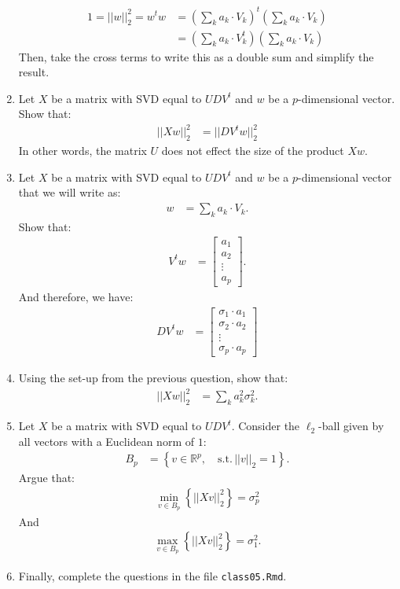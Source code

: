 \documentclass[12pt,hidelinks]{article}
\numberwithin{equation}{section}
\begin{document}
\begin{enumerate}
\begin{align}
1 = || w ||_2^2 = w^t w &= \left(\sum_k a_k \cdot V_k \right)^t \left(\sum_k a_k \cdot V_k \right) \\
&= \left(\sum_k a_k \cdot V_k^t \right) \left(\sum_k a_k \cdot V_k \right)
\end{align}
Then, take the cross terms to write this as a double sum and simplify the
result.
\item Let $X$ be a matrix with SVD equal to $UDV^t$ and $w$ be a
$p$-dimensional vector. Show that:
\begin{align}
|| X w ||_2^2 &= || D V^t w ||_2^2
\end{align}
In other words, the matrix $U$ does not effect the size of the product $X w$.
\item Let $X$ be a matrix with SVD equal to $UDV^t$ and $w$ be a
$p$-dimensional vector that we will write as:
\begin{align}
w &= \sum_k a_k \cdot V_k.
\end{align}
Show that:
\begin{align}
V^t w &= \begin{bmatrix} a_1 \\ a_2 \\ \vdots \\ a_p \end{bmatrix}.
\end{align}
And therefore, we have:
\begin{align}
D V^t w &= \begin{bmatrix} \sigma_1 \cdot a_1 \\ \sigma_2 \cdot a_2 \\ \vdots \\ \sigma_p \cdot a_p \end{bmatrix}
\end{align}
\item Using the set-up from the previous question, show that:
\begin{align}
|| X w ||_2^2 &= \sum_k a_k^2 \sigma_k^2.
\end{align}
\item Let $X$ be a matrix with SVD equal to $UDV^t$. Consider the $\ell_2$-ball
given by all vectors with a Euclidean norm of $1$:
\begin{align}
B_p &= \left\{ v \in \mathbb{R}^p, \quad \text{s.t.} \, ||v||_2 = 1 \right\}.
\end{align}
Argue that:
\begin{align}
\min_{v \in B_p} \left\{ || X v ||_2^2 \right\} = \sigma_p^2
\end{align}
And
\begin{align}
\max_{v \in B_p} \left\{ || X v ||_2^2 \right\} = \sigma_1^2.
\end{align}
\item Finally, complete the questions in the file \texttt{class05.Rmd}.


\end{enumerate}
\end{document}
